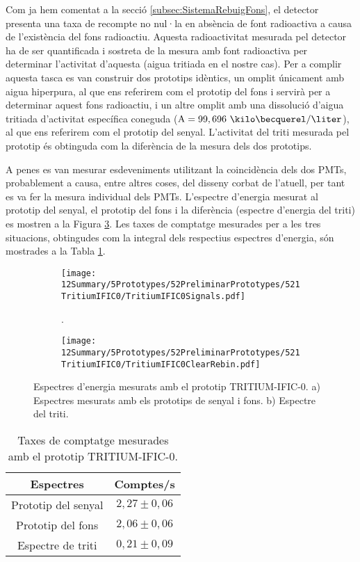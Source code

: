 Com ja hem comentat a la secció \ref{subsec:SistemaRebuigFons}, el detector presenta una taxa de recompte no nul·la en absència de font radioactiva a causa de l'existència del fons radioactiu. Aquesta radioactivitat mesurada pel detector ha de ser quantificada i sostreta de la mesura amb font radioactiva per determinar l'activitat d'aquesta (aigua tritiada en el nostre cas). Per a complir aquesta tasca es van construir dos prototips idèntics, un omplit únicament amb aigua hiperpura, al que ens referirem com el prototip del fons i servirà per a determinar aquest fons radioactiu, i un altre omplit amb una dissolució d'aigua tritiada d'activitat específica coneguda ($\text{A}=99,696~\kilo\becquerel/\liter$), al que ens referirem com el prototip del senyal. L'activitat del triti mesurada pel prototip és obtinguda com la diferència de la mesura dels dos prototips.

A penes es van mesurar esdeveniments utilitzant la coincidència dels dos PMTs, probablement a causa, entre altres coses, del disseny corbat de l'atuell, per tant es va fer la mesura individual dels PMTs. L'espectre d'energia mesurat al prototip del senyal, el prototip del fons i la diferència (espectre d'energia del triti) es mostren a la Figura \ref{fig:EspectresEnergeticsTritiumIFIC0}. Les taxes de comptatge mesurades per a les tres situacions, obtingudes com la integral dels respectius espectres d'energia, són mostrades a la Tabla \ref{tab:ContesPerSegonTRITIUMIFIC0}. 

\begin{figure}
\centering
    \begin{subfigure}[b]{1\textwidth}
    \centering
    \texttt{[image: 12Summary/5Prototypes/52PreliminarPrototypes/521TritiumIFIC0/TritiumIFIC0Signals.pdf]}  
    \caption{.\label{subfig:EspectreSenyalFonsTritiumIFIC0}}
    \end{subfigure}
    \hfill
    \begin{subfigure}[b]{1\textwidth}
    \centering
    \texttt{[image: 12Summary/5Prototypes/52PreliminarPrototypes/521TritiumIFIC0/TritiumIFIC0ClearRebin.pdf]}  
    \caption{\label{subfig:EspectreTritiTritiumIFIC0}}
    \end{subfigure}
 \caption{Espectres d'energia mesurats amb el prototip TRITIUM-IFIC-0. a) Espectres mesurats amb els prototips de senyal i fons. b) Espectre del triti.}
 \label{fig:EspectresEnergeticsTritiumIFIC0}
\end{figure}

\begin{table}[htbp]
\centering{}%
\begin{tabular}{cc}
\toprule 
Espectres & Comptes/s\tabularnewline
\midrule
\midrule 
Prototip del senyal & $2,27 \pm 0,06$ \tabularnewline
Prototip del fons & $2,06 \pm 0,06$ \tabularnewline  
Espectre de triti & $0,21 \pm 0,09$ \tabularnewline
\bottomrule
\end{tabular}
\caption{Taxes de comptatge mesurades amb el prototip TRITIUM-IFIC-0.}
\label{tab:ContesPerSegonTRITIUMIFIC0}
\end{table}


